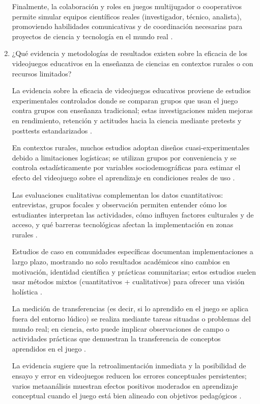 \begin{enumerate}
    Finalmente, la colaboración y roles en juegos multijugador o cooperativos permite simular equipos científicos reales (investigador, técnico, analista), promoviendo habilidades comunicativas y de coordinación necesarias para proyectos de ciencia y tecnología en el mundo real \cite{}.

    \item ¿Qué evidencia y metodologías de resultados existen sobre la eficacia de los videojuegos educativos en la enseñanza de ciencias en contextos rurales o con recursos limitados?
    
    La evidencia sobre la eficacia de videojuegos educativos proviene de estudios experimentales controlados donde se comparan grupos que usan el juego contra grupos con enseñanza tradicional; estas investigaciones miden mejoras en rendimiento, retención y actitudes hacia la ciencia mediante pretests y posttests estandarizados \cite{}.

    En contextos rurales, muchos estudios adoptan diseños cuasi-experimentales debido a limitaciones logísticas; se utilizan grupos por conveniencia y se controla estadísticamente por variables sociodemográficas para estimar el efecto del videojuego sobre el aprendizaje en condiciones reales de uso \cite{}.

    Las evaluaciones cualitativas complementan los datos cuantitativos: entrevistas, grupos focales y observación permiten entender cómo los estudiantes interpretan las actividades, cómo influyen factores culturales y de acceso, y qué barreras tecnológicas afectan la implementación en zonas rurales \cite{}.

    Estudios de caso en comunidades específicas documentan implementaciones a largo plazo, mostrando no solo resultados académicos sino cambios en motivación, identidad científica y prácticas comunitarias; estos estudios suelen usar métodos mixtos (cuantitativos + cualitativos) para ofrecer una visión holística \cite{}.

    La medición de transferencias (es decir, si lo aprendido en el juego se aplica fuera del entorno lúdico) se realiza mediante tareas situadas o problemas del mundo real; en ciencia, esto puede implicar observaciones de campo o actividades prácticas que demuestran la transferencia de conceptos aprendidos en el juego \cite{}.

    La evidencia sugiere que la retroalimentación inmediata y la posibilidad de ensayo y error en videojuegos reducen los errores conceptuales persistentes; varios metaanálisis muestran efectos positivos moderados en aprendizaje conceptual cuando el juego está bien alineado con objetivos pedagógicos \cite{}.


\end{enumerate}
